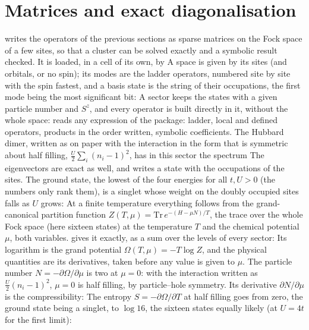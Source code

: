\documentclass[11pt,a4paper]{article}
\begin{document}
\section{Matrices and exact diagonalisation}
 writes the operators of the previous sections as sparse matrices on the Fock space of a few sites,
so that a cluster can be solved exactly and a symbolic result checked. It is loaded, in a cell of its own, by
A space is given by its sites (and orbitals, or no
spin); its modes are the ladder operators, numbered site by site with the spin fastest, and a basis state is the string of
their occupations, the first mode being the most significant bit:
A sector keeps the states with a given particle number and $S^z$, and every operator is built directly in it, without
the whole space:
 reads any expression of the package: ladder, local and defined operators, products in the order written,
symbolic coefficients. The Hubbard dimer, written as on paper with the interaction in the form that is symmetric about
half filling, $\frac U2\sum_i(n_i-1)^2$, has in this sector the spectrum
The eigenvectors are exact as well, and  writes a state with the occupations of the sites. The ground
state, the lowest of the four energies for all $t,U>0$ (the numbers only rank them), is a singlet whose weight on the
doubly occupied sites falls as $U$ grows:
At a finite temperature everything follows from the grand-canonical partition function
$Z(T,\mu)=\mathrm{Tr}\,e^{-(H-\mu N)/T}$, the trace over the whole Fock space (here sixteen states) at the temperature $T$
and the chemical potential $\mu$, both variables.  gives it exactly, as a sum over the levels of every
sector:
Its logarithm is the grand potential $\Omega(T,\mu)=-T\log Z$, and the physical quantities are its derivatives, taken before
any value is given to $\mu$. The particle number $N=-\partial\Omega/\partial\mu$ is two at $\mu=0$: with the interaction written as
$\frac U2(n_i-1)^2$, $\mu=0$ is half filling, by particle--hole symmetry. Its derivative $\partial N/\partial\mu$ is the
compressibility:
The entropy $S=-\partial\Omega/\partial T$ at half filling goes from zero, the ground state being a singlet, to $\log 16$, the
sixteen states equally likely (at $U=4t$ for the first limit):
\end{document}
